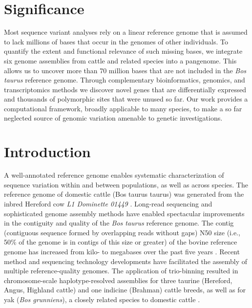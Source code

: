 \documentclass[../main.tex]{subfiles}
\begin{document}
\newpage

\section*{Significance}
\linespread{1.25}
Most sequence variant analyses rely on a linear reference genome that is assumed to lack millions of bases that occur in the genomes of other individuals. To quantify the extent and functional relevance of such missing bases, we integrate six genome assemblies from cattle and related species into a pangenome. This allows us to uncover more than 70 million bases that are not included in the \emph{Bos taurus} reference genome. Through complementary bioinformatics, genomics, and transcriptomics methods we discover novel genes that are differentially expressed and thousands of polymorphic sites that were unused so far. Our work provides a computational framework, broadly applicable to many species, to make a so far neglected source of genomic variation amenable to genetic investigations.

\section{Introduction}
 
\normalsize

A well-annotated reference genome enables systematic characterization of sequence variation within and between populations, as well as across species. The reference genome of domestic cattle (Bos taurus taurus) was generated from the inbred Hereford cow \emph{L1 Dominette 01449} \citep{rosen2020novo}. Long-read sequencing and sophisticated genome assembly methods have enabled spectacular improvements in the contiguity and quality of the \emph{Bos taurus} reference genome. The contig (contiguous sequence formed by overlapping reads without gaps) N50 size (i.e., 50\% of the genome is in contigs of this size or greater) of the bovine reference genome has increased from kilo- to megabases over the past five years \citep{rosen2020novo}. Recent method and sequencing technology developments have facilitated the assembly of multiple reference-quality genomes. The application of trio-binning \citep{koren2018novo} resulted in chromosome-scale haplotype-resolved assemblies for three taurine (Hereford, Angus, Highland cattle) and one indicine (Brahman) cattle breeds, as well as for yak (\emph{Bos grunniens}), a closely related species to domestic cattle \citep{low2020haplotype,rice2020continuous}.
\end{document}
